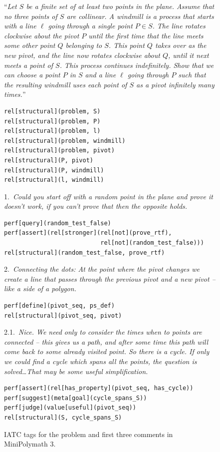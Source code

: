 \documentclass[smallextended,oneside]{svjour3}       %
\begin{document}
\begin{figure}
\begin{mdframed}
``\emph{Let $S$ be a finite set of at least two points in the plane. Assume that no three points of $S$ are collinear. A windmill is a process that starts with a line $\ell$ going through a single point $P \in S$. The line rotates clockwise about the pivot $P$ until the first time that the line meets some other point $Q$ belonging to $S$. This point $Q$ takes over as the new pivot, and the line now rotates clockwise about $Q$, until it next meets a point of $S$. This process continues indefinitely. Show that we can choose a point $P$ in $S$ and a line $\ell$ going through $P$ such that the resulting windmill uses each point of $S$ as a pivot infinitely many times.}''

\begin{Verbatim}[commandchars=\\\{\}]
rel[structural](problem, S)
rel[structural](problem, P)
rel[structural](problem, l)
rel[structural](problem, windmill)
rel[structural](problem, pivot)
rel[structural](P, pivot)
rel[structural](P, windmill)
rel[structural](l, windmill)
\end{Verbatim}

1.~\emph{Could you start off with a random point in the plane and prove it doesn't work, if you can't prove that then the opposite holds.}

\begin{Verbatim}[commandchars=\\\{\}]
perf[query](random_test_false)
perf[assert](rel[stronger](rel[not](prove_rtf),
                           rel[not](random_test_false)))
rel[structural](random_test_false, prove_rtf)
\end{Verbatim}

2.~\emph{Connecting the dots: At the point where the pivot changes we create a line that passes through the previous pivot and a new pivot -- like a side of a polygon.}

\begin{Verbatim}[commandchars=\\\{\}]
perf[define](pivot_seq, ps_def)
rel[structural](pivot_seq, pivot)
\end{Verbatim}

2.1.~\emph{Nice. We need only to consider the times when to points are connected -- this gives us a path, and after some time this path will come back to some already visited point. So there is a cycle. If only we could find a cycle which spans all the points, the question is solved\ldots That may be some useful simplification.}

\begin{Verbatim}[commandchars=\\\{\}]
perf[assert](rel[has_property](pivot_seq, has_cycle))
perf[suggest](meta[goal](cycle_spans_S))
perf[judge](value[useful](pivot_seq))
rel[structural](S, cycle_spans_S)
\end{Verbatim}
\end{mdframed}

\caption{IATC tags for the problem and first three comments in MiniPolymath 3. \label{fig:mpm3-example}}
\end{figure}
\end{document}
